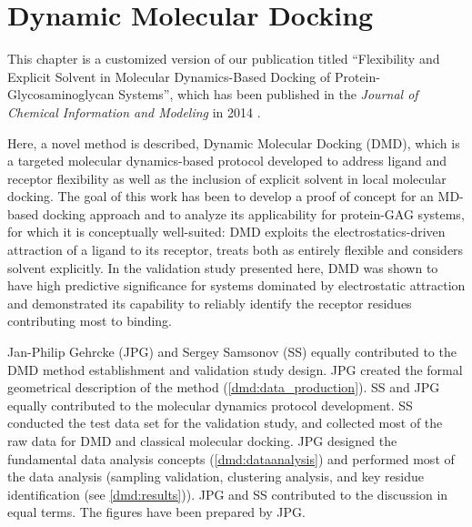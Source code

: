 \chapter{Dynamic Molecular Docking}
\label{chapter:dmd}



This chapter is a customized version of our publication titled
\enquote{Flexibility and Explicit Solvent in Molecular Dynamics-Based Docking of
Protein-Glycosaminoglycan Systems}, which has been published in the
\textit{Journal of Chemical Information and Modeling} in 2014
\cite{dmd_samsonov_gehrcke_2014}.

Here, a novel method is described, Dynamic Molecular Docking (DMD), which is a
targeted molecular dynamics-based protocol developed to address ligand and
receptor flexibility as well as the inclusion of explicit solvent in local
molecular docking. The goal of this work has been to develop a proof of concept
for an MD-based docking approach and to analyze its applicability for
protein-GAG systems, for which it is conceptually well-suited: DMD exploits the
electrostatics-driven attraction of a ligand to its receptor, treats both as
entirely flexible and considers solvent explicitly. In the validation study
presented here, DMD was shown to have high predictive significance for systems
dominated by electrostatic attraction and demonstrated its capability to
reliably identify the receptor residues contributing most to binding.

Jan-Philip Gehrcke (JPG) and Sergey Samsonov (SS) equally contributed to the DMD
method establishment and validation study design. JPG created the formal
geometrical description of the method (\cref{dmd:data_production}). SS and JPG
equally contributed to the molecular dynamics protocol development. SS conducted
the test data set for the validation study, and collected most of the raw data
for DMD and classical molecular docking. JPG designed the fundamental data
analysis concepts (\cref{dmd:dataanalysis}) and performed most of the data
analysis (sampling validation, clustering analysis, and key residue
identification (see \cref{dmd:results})). JPG and SS contributed to the
discussion in equal terms. The figures have been prepared by JPG.

